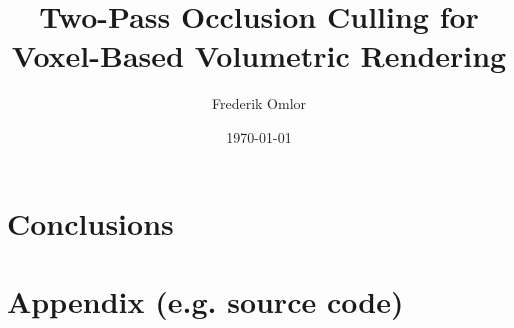 \documentclass[ a4paper,
                oneside,
                toc=bibliography,
                toc=listof
                ]{scrbook}
\author{Frederik Omlor}
\title{Two-Pass Occlusion Culling for Voxel-Based Volumetric Rendering}
\date{\today}
\begin{document}
 
    \frontmatter
    \makeISWtitle

	\cleardoublepage
	\setcounter{page}{1} %
    \declarationOfOriginality

    

    
    
    \cleardoublepage
    \tableofcontents

    \mainmatter
    
    \nocite{*}

    
    
    \chapter{Conclusions}

    
    \cleardoublepage
    \printbibliography
    \cleardoublepage
    
    
    \cleardoublepage
    \listoffigures
    
    \cleardoublepage
    \listoftables
    
    
    
    \appendix
    \chapter{Appendix (e.g. source code)} \label{cpt-appendix}
\end{document}
